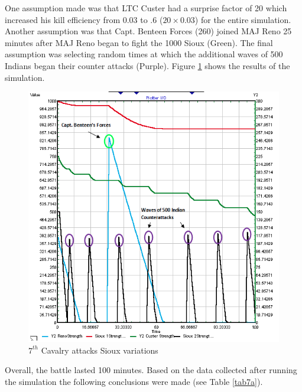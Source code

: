 \documentclass[letterpaper,10pt]{article}
\begin{document}
One assumption made was that LTC Custer had a surprise factor of 20 which increased his kill efficiency from 0.03 to .6 ($20\times 0.03$) for the entire simulation.  Another assumption was that Capt. Benteen Forces (260) joined MAJ Reno 25 minutes after MAJ Reno began to fight the 1000 Sioux (Green). The final assumption was selecting random times at which the additional waves of 500 Indians began their counter attacks (Purple). Figure \ref{fig7a} shows the results of the simulation.
\begin{figure}[h!tp]
\begin{center}
\includegraphics[scale=0.6]{fig7a.png}
\caption{$7^{th}$ Cavalry attacks Sioux variations}
\label{fig7a}
\end{center}
\end{figure}

Overall, the battle lasted 100 minutes. Based on the data collected after running the simulation the following conclusions were made (see Table \ref{tab7a}).
\end{document}
